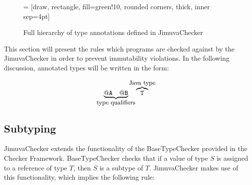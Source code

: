 \documentclass{pracamgr}
\theoremstyle{break}
\theoremstyle{break}
\theoremstyle{break}
\begin{document}
\begin{figure}[pt]
  \centering
   = [draw, rectangle, fill=green!10, rounded corners, thick, inner sep=4pt]    
  \caption{Full hierarchy of type annotations defined in JimuvaChecker}
  \label{fig:hierarchy}
\end{figure}

This section will present the rules which programs are checked against
by the JimuvaChecker in order to prevent immutability violations. In
the following discussion, annotated types will be written in the form:

$$\underbrace{\mathtt{@A\quad @B}}_{\mathclap{\textrm{\small{type qualifiers}}}}\quad \overbrace{\mathtt{T}}^{\mathclap{\textrm{\small{Java type}}}}$$

\subsection{Subtyping}
\label{sec:chk:hierarchy}

JimuvaChecker extends the functionality of the BaseTypeChecker
provided in the Checker Framework. BaseTypeChecker checks that if a
value of type $S$ is assigned to a reference of type $T$, then $S$ is
a subtype of $T$. JimuvaChecker makes use of this functionality, which
implies the following rule:
\end{document}
